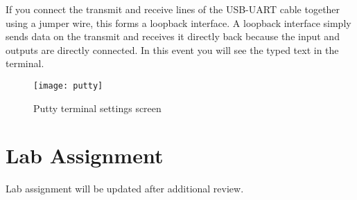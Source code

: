 \documentclass[11pt,fleqn]{book} %
\begin{document}
If you connect the transmit and receive lines of the USB-UART cable together using a jumper wire, this forms a loopback interface. A loopback interface simply sends data on the transmit and receives it directly back because the input and outputs are directly connected. In this event you will see the typed text in the terminal. 

\begin{figure}[]
    \centering\texttt{[image: putty]}
    \caption{Putty terminal settings screen}
    \label{putty}
\end{figure}



\section{Lab Assignment}
Lab assignment will be updated after additional review.
\end{document}
